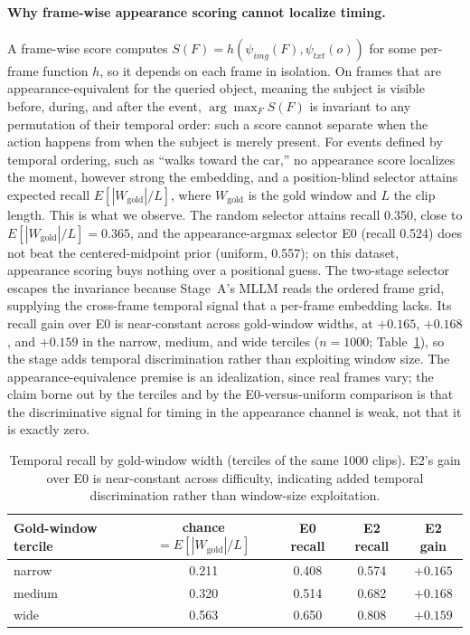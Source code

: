\paragraph{Why frame-wise appearance scoring cannot localize timing.} A frame-wise score computes $S(F) = h(\psi_{img}(F), \psi_{txt}(o))$ for some per-frame function $h$, so it depends on each frame in isolation. On frames that are appearance-equivalent for the queried object, meaning the subject is visible before, during, and after the event, $\arg\max_F S(F)$ is invariant to any permutation of their temporal order: such a score cannot separate when the action happens from when the subject is merely present. For events defined by temporal ordering, such as ``walks toward the car,'' no appearance score localizes the moment, however strong the embedding, and a position-blind selector attains expected recall $E[|W_{\mathrm{gold}}|/L]$, where $W_{\mathrm{gold}}$ is the gold window and $L$ the clip length. This is what we observe. The random selector attains recall 0.350, close to $E[|W_{\mathrm{gold}}|/L] = 0.365$, and the appearance-argmax selector E0 (recall 0.524) does not beat the centered-midpoint prior (uniform, 0.557); on this dataset, appearance scoring buys nothing over a positional guess. The two-stage selector escapes the invariance because Stage~A's MLLM reads the ordered frame grid, supplying the cross-frame temporal signal that a per-frame embedding lacks. Its recall gain over E0 is near-constant across gold-window widths, at $+0.165$, $+0.168$, and $+0.159$ in the narrow, medium, and wide terciles ($n=1000$; Table~\ref{tab:tercile}), so the stage adds temporal discrimination rather than exploiting window size. The appearance-equivalence premise is an idealization, since real frames vary; the claim borne out by the terciles and by the E0-versus-uniform comparison is that the discriminative signal for timing in the appearance channel is weak, not that it is exactly zero.

\begin{table}[htbp]
\centering
\begin{tabular}{lcccc}
\toprule
Gold-window tercile & chance $= E[|W_{\mathrm{gold}}|/L]$ & E0 recall & E2 recall & E2 gain \\
\midrule
narrow & 0.211 & 0.408 & 0.574 & $+0.165$ \\
medium & 0.320 & 0.514 & 0.682 & $+0.168$ \\
wide & 0.563 & 0.650 & 0.808 & $+0.159$ \\
\bottomrule
\end{tabular}
\caption{Temporal recall by gold-window width (terciles of the same 1000 clips). E2's gain over E0 is near-constant across difficulty, indicating added temporal discrimination rather than window-size exploitation.}
\label{tab:tercile}
\end{table}
